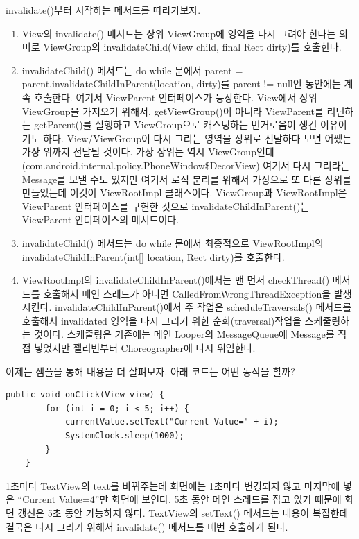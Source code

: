 invalidate()부터 시작하는 메서드를 따라가보자.
\begin{enumerate}
\item View의 invalidate() 메서드는 상위 ViewGroup에 영역을 다시 그려야 한다는 의미로 ViewGroup의 invalidateChild(View child, final Rect dirty)를 호출한다. 

\item invalidateChild() 메서드는 do while 문에서 parent = parent.invalidateChildInParent(location, dirty)를 parent != null인 동안에는 계속 호출한다. 여기서 ViewParent 인터페이스가 등장한다. View에서 상위 ViewGroup을 가져오기 위해서, getViewGroup()이 아니라 ViewParent를 리턴하는 getParent()를 실행하고 ViewGroup으로 캐스팅하는 번거로움이 생긴 이유이기도 하다. 
View/ViewGroup이 다시 그리는 영역을 상위로 전달하다 보면 어쨌든 가장 위까지 전달될 것이다. 가장 상위는 역시 ViewGroup인데(com.android.internal.policy.PhoneWindow\$DecorView) 여기서 다시 그리라는 Message를 보낼 수도 있지만 여기서 로직 분리를 위해서 가상으로 또 다른 상위를 만들었는데 이것이 ViewRootImpl 클래스이다.
ViewGroup과 ViewRootImpl은 ViewParent 인터페이스를 구현한 것으로 invalidateChildInParent()는 ViewParent 인터페이스의 메서드이다.

\item invalidateChild() 메서드는 do while 문에서 최종적으로 ViewRootImpl의 invalidateChildInParent(int[] location, Rect dirty)를 호출한다.

\item ViewRootImpl의 invalidateChildInParent()에서는 맨 먼저 checkThread() 메서드를 호출해서 메인 스레드가 아니면 CalledFromWrongThreadException을 발생시킨다.
invalidateChildInParent()에서 주 작업은 scheduleTraversals() 메서드를 호출해서 invalidated 영역을 다시 그리기 위한 순회(traversal)작업을 스케줄링하는 것이다. 스케줄링은 기존에는 메인 Looper의 MessageQueue에 Message를 직접 넣었지만 젤리빈부터 Choreographer에 다시 위임한다.
\end{enumerate}

이제는 샘플을 통해 내용을 더 살펴보자. 아래 코드는 어떤 동작을 할까?
\begin{lstlisting}[frame=single] 
	public void onClick(View view) {
		for (int i = 0; i < 5; i++) {
			currentValue.setText("Current Value=" + i);
			SystemClock.sleep(1000);
		}
	}
\end{lstlisting}
1초마다 TextView의 text를 바꿔주는데 화면에는 1초마다 변경되지 않고 마지막에 넣은 ``Current Value=4''만 화면에 보인다.
5초 동안 메인 스레드를 잡고 있기 때문에 화면 갱신은 5초 동안 가능하지 않다. 
TextView의 setText() 메서드는 내용이 복잡한데 결국은 다시 그리기 위해서 invalidate() 메서드를 매번 호출하게 된다.\\

